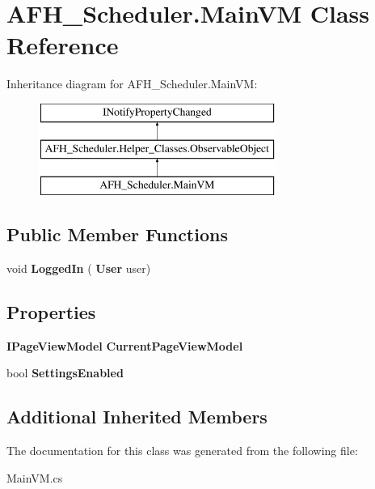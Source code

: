 \section{A\+F\+H\+\_\+\+Scheduler.\+Main\+VM Class Reference}
\label{class_a_f_h___scheduler_1_1_main_v_m}
Inheritance diagram for A\+F\+H\+\_\+\+Scheduler.\+Main\+VM\+:\begin{figure}[H]
\begin{center}
\leavevmode
\includegraphics[height=3.000000cm]{class_a_f_h___scheduler_1_1_main_v_m}
\end{center}
\end{figure}
\subsection*{Public Member Functions}
\begin{DoxyCompactItemize}
\item 
\mbox{\label{class_a_f_h___scheduler_1_1_main_v_m_add1ae29ee4eb0e34ff9ebc1326617e8d}} 
void {\bfseries Logged\+In} (\textbf{ User} user)
\end{DoxyCompactItemize}
\subsection*{Properties}
\begin{DoxyCompactItemize}
\item 
\mbox{\label{class_a_f_h___scheduler_1_1_main_v_m_ae12e9d96e0f3f7261d24cbcab17ee71d}} 
\textbf{ I\+Page\+View\+Model} {\bfseries Current\+Page\+View\+Model}\hspace{0.3cm}{\ttfamily  [get, set]}
\item 
\mbox{\label{class_a_f_h___scheduler_1_1_main_v_m_a154f34407f28855ec6305414581fe971}} 
bool {\bfseries Settings\+Enabled}\hspace{0.3cm}{\ttfamily  [get, set]}
\end{DoxyCompactItemize}
\subsection*{Additional Inherited Members}


The documentation for this class was generated from the following file\+:\begin{DoxyCompactItemize}
\item 
Main\+V\+M.\+cs\end{DoxyCompactItemize}
